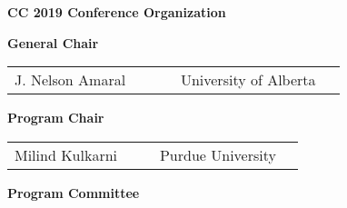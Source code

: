 \documentclass[12pt,letterpaper]{article}
\begin{document}

\thispagestyle{empty}
\pagestyle{empty}

\begin{center}

{\LARGE \sffamily\bfseries CC 2019 Conference Organization}
\bigskip
\bigskip

{\Large\sffamily\bfseries General Chair}
\medskip

\begin{tabular}{>{\raggedleft}p{0.45\linewidth}%
>{\raggedright}p{0.45\linewidth}}
J. Nelson Amaral & University of Alberta  
\end{tabular}

\medskip
{\Large\sffamily\bfseries Program Chair}
\medskip

\begin{tabular}{>{\raggedleft\arraybackslash}p{0.45\linewidth}%
>{\raggedright\arraybackslash}p{0.45\linewidth}}
Milind Kulkarni & Purdue University
\end{tabular}

\medskip
{\Large\sffamily\bfseries Program Committee}
\medskip


\end{center}
\end{document}
